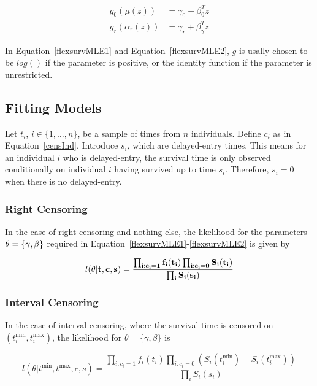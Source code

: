 \begin{align}
    g_0(\mu(z)) &= \gamma_0 + \beta_0^Tz \label{flexsurvMLE1}\\
    g_r(\alpha_r(z)) &= \gamma_r + \beta_{\gamma}^Tz \label{flexsurvMLE2}
\end{align}

In Equation~\ref{flexsurvMLE1} and Equation~\ref{flexsurvMLE2}, $g$ is usally chosen to be $log()$ if the parameter is positive, or the identity function if the parameter is unrestricted.

\subsection{Fitting Models}
Let $t_i$, $i \in \{1, \ldots, n\}$, be a sample of times from $n$ individuals. Define $c_i$ as in Equation~\ref{censInd}. Introduce $s_i$, which are delayed-entry times. This means for an individual $i$ who is delayed-entry, the survival time is only observed conditionally on individual $i$ having survived up to time $s_i$. Therefore, $s_i = 0$ when there is no delayed-entry. 

\subsubsection{Right Censoring}
In the case of right-censoring and nothing else, the likelihood for the parameters $\bf{\theta} = \{\bf{\gamma}, \bf{\beta}\}$ required in Equation~\ref{flexsurvMLE1}-\ref{flexsurvMLE2} is given by 

\begin{equation}
    l(\bf{\theta}|t,c,s) = \frac{\prod_{i:c_i=1} f_i(t_i) \prod_{i:c_i=0} S_i(t_i)}{\prod_{i} S_i(s_i)}
    \label{flexsurvRightCens}
\end{equation}

\subsubsection{Interval Censoring}
In the case of interval-censoring, where the survival time is censored on $(t_i^{\text{min}}, t_i^{\text{max}})$, the likelihood for $\theta = \{\gamma, \beta\}$ is 

\begin{equation}
    \label{flexSurvIntCens}
    l(\theta|t^\text{min}, t^\text{max}, c,s) = \frac{\prod_{i:c_i=1} f_i(t_i) \prod_{i:c_i=0} \left(S_i(t_i^{\text{min}}) - S_i(t_i^{\text{max}}) \right)}{\prod_{i} S_i(s_i)}
\end{equation}

